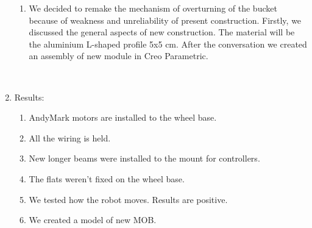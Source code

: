 \begin{enumerate}
\begin{enumerate}
	   \item We decided to remake the mechanism of overturning of the bucket because of weakness and unreliability of present construction. Firstly, we discussed the general aspects of new construction. The material will be the aluminium L-shaped profile 5x5 cm. After the conversation we created an assembly of new module in Creo Parametric.
	   \begin{figure}[H]
	   	\begin{minipage}[h]{0.2\linewidth}
	   		\center  
	   	\end{minipage}
	   	\begin{minipage}[h]{0.6\linewidth}
	   		\caption{}
	   	\end{minipage}
	   \end{figure}

	\end{enumerate}
	
	\item Results:
	\begin{enumerate}
		
		\item AndyMark motors are installed to the wheel base.
		
		\item All the wiring is held.
		
		\item New longer beams were installed to the mount for controllers.
		
		\item The flats weren't fixed on the wheel base.
		
		\item We tested how the robot moves. Results are positive.
		
		\item We created a model of new MOB.
		

\end{enumerate}
\end{enumerate}

